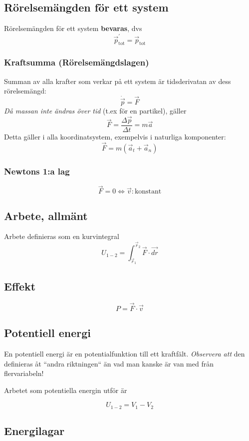 \documentclass{article}
\newenvironment{ankiflashcard}[1][ ]{}{}
\begin{document}
\begin{paracol}{2}
\subsection{Rörelsemängden för ett system}
Rörelsemängden för ett system \textbf{bevaras}, dvs
$$\vec p_{\text{tot}}^{\prime} = \vec p_{\text{tot}}$$
\subsubsection{Kraftsumma (Rörelsemängdslagen)}
Summan av alla krafter som verkar på ett system är tidsderivatan av dess rörelsemängd:
$$\dot{\vec p} = \vec F$$
\textit{Då massan inte ändras över tid} (t.ex för en partikel), gäller
$$\vec F= \frac{\Delta \vec p}{\Delta t} = m\vec a$$
Detta gäller i alla koordinatsystem, exempelvis i naturliga komponenter:
$$\vec F = m(\vec a_t + \vec a_n)$$
\subsubsection{Newtons 1:a lag}
$$\vec F = 0 \iff \vec v: \text{konstant}$$
\subsection{Arbete, allmänt}

\begin{ankiflashcard}
Arbete definieras som en kurvintegral
$$
U_{1-2} = \int_{\vec r_1}^{\vec r_2} \vec F \cdot \vec{dr}
$$
\end{ankiflashcard}
\subsection{Effekt}
$$P = \vec F \cdot \vec v$$
\subsection{Potentiell energi}
En potentiell energi är en potentialfunktion till ett kraftfält. \textit{Observera att} den definieras åt ``andra riktningen`` än vad man kanske är van med från flervariabeln!

Arbetet som potentiella energin utför är

\begin{ankiflashcard}
$$
U_{1-2} = V_1 - V_2
$$
\end{ankiflashcard}
\subsection{Energilagar}

\end{paracol}
\end{document}
